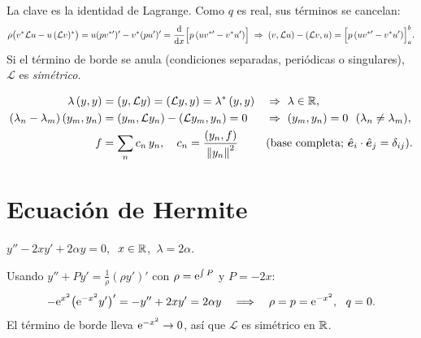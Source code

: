 \documentclass[10pt,a4paper]{article}
\newcommand{\Lop}{\mathcal{L}}
\begin{document}
La clave es la identidad de Lagrange. Como $q$ es real, sus términos se cancelan:
\begin{equation}\label{eq:lag}
\rho\bigl(v^*\Lop u-u\,(\Lop v)^*\bigr)=u(pv^{*\prime})'-v^*(pu')'=\dv{}{x}\Bigl[p\,(uv^{*\prime}-v^*u')\Bigr]
\;\Rightarrow\;
\ip{v}{\Lop u}-\ip{\Lop v}{u}=\Bigl[p\,(uv^{*\prime}-v^*u')\Bigr]_a^b .
\end{equation}
Si el término de borde se anula (condiciones separadas, periódicas o singulares), $\Lop$ es \emph{simétrico}.

\begin{teorema}
\begin{align}
\lambda\ip{y}{y}&=\ip{y}{\Lop y}=\ip{\Lop y}{y}=\lambda^*\ip{y}{y}&&\Rightarrow\ \lambda\in\R,\\
(\lambda_n-\lambda_m)\ip{y_m}{y_n}&=\ip{y_m}{\Lop y_n}-\ip{\Lop y_m}{y_n}=0&&\Rightarrow\ \ip{y_m}{y_n}=0\ \ (\lambda_n\neq\lambda_m),\\
f&=\sum_n c_n\,y_n,\quad c_n=\frac{\ip{y_n}{f}}{\norm{y_n}^2}&&\text{(base completa; $\hat{\bm e}_i\cdot\hat{\bm e}_j=\delta_{ij}$)}.
\end{align}
\end{teorema}

\section{Ecuación de Hermite}
\begin{definicion}
$y''-2xy'+2\alpha y=0$, $\ x\in\mathbb{R}$, $\ \lambda=2\alpha$.
\end{definicion}

Usando $y''+Py'=\frac1\rho(\rho y')'$ con $\rho=\mathrm{e}^{\int P}$ y $P=-2x$:
\begin{equation}
-\mathrm{e}^{x^2}\bigl(\mathrm{e}^{-x^2}y'\bigr)'=-y''+2xy'=2\alpha y
\quad\Longrightarrow\quad
\rho=p=\mathrm{e}^{-x^2},\ \ q=0 .
\end{equation}
El término de borde lleva $\mathrm{e}^{-x^2}\to0$, así que $\Lop$ es simétrico en $\mathbb{R}$.
\end{document}
